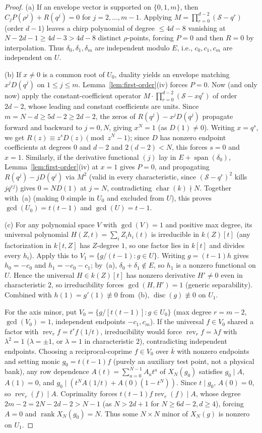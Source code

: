 \documentclass[11pt,reqno]{amsart}
\numberwithin{equation}{section}
\theoremstyle{definition}
\theoremstyle{remark}
\newcommand{\rank}{\operatorname{rank}}
\newcommand{\disc}{\operatorname{disc}}
\newcommand{\rev}{\operatorname{rev}}
\begin{document}
\begin{proof}
(a) If an envelope vector is supported on $\{0,1,m\}$, then $C_j P(\rho^j)+R(q^j)=0$ for $j=2,\ldots,m-1$. Applying $M=\prod_{r=0}^{d-2}(\mathcal{S}-q^r)$ (order $d-1$) leaves a chirp polynomial of degree $\le 4d-8$ vanishing at $N-2d-1\ge 4d-3 > 4d-8$ distinct $\rho$-points, forcing $P=0$ and then $R=0$ by interpolation. Thus $\delta_0,\delta_1,\delta_m$ are independent modulo $E$, i.e., $c_0,c_1,c_m$ are independent on $U$.

(b) If $x\ne 0$ is a common root of $U_0$, duality yields an envelope matching $x^j D(q^j)$ on $1\le j\le m$. Lemma~\ref{lem:first-order}(iv) forces $P=0$. Now (and only now) apply the constant-coefficient operator $M\cdot\prod_{r=0}^{d-2}(\mathcal{S}-xq^r)$ of order $2d-2$, whose leading and constant coefficients are units. Since $m=N-d\ge 5d-2\ge 2d-2$, the zeros of $R(q^j)-x^j D(q^j)$ propagate forward and backward to $j=0,N$, giving $x^N=1$ (as $D(1)\ne 0$). Writing $x=q^s$, we get $R(z)\equiv z^s D(z)\pmod{z^N-1}$; since $D$ has nonzero endpoint coefficients at degrees $0$ and $d-2$ and $2(d-2)<N$, this forces $s=0$ and $x=1$. Similarly, if the derivative functional $(j)$ lay in $E+\operatorname{span}(\delta_0)$, Lemma~\ref{lem:first-order}(iv) at $x=1$ gives $P=0$, and propagating $R(q^j)-jD(q^j)$ via $M^2$ (valid in every characteristic, since $(\mathcal{S}-q^r)^2$ kills $jq^{rj}$) gives $0=ND(1)$ at $j=N$, contradicting $\operatorname{char}(k)\nmid N$. Together with~(a) (making $0$ simple in $U_0$ and excluded from $U$), this proves $\gcd(U_0)=t(t-1)$ and $\gcd(U)=t-1$.

(c) For any polynomial space $V$ with $\gcd(V)=1$ and positive max degree, its universal polynomial $H(Z,t)=\sum_i Z_i h_i(t)$ is irreducible in $k(Z)[t]$ (any factorization in $k[t,Z]$ has $Z$-degree $1$, so one factor lies in $k[t]$ and divides every $h_i$). Apply this to $V_1 = \{g/(t-1) : g\in U\}$. Writing $g=(t-1)h$ gives $h_0=-c_0$ and $h_1=-c_0-c_1$; by~(a), $\delta_0+\delta_1\notin E$, so $h_1$ is a nonzero functional on $U$. Hence the universal $H\in k(Z)[t]$ has nonzero derivative $H'\ne 0$ even in characteristic $2$, so irreducibility forces $\gcd(H,H')=1$ (generic separability). Combined with $h(1)=g'(1)\not\equiv 0$ from~(b), $\disc(g)\not\equiv 0$ on $U_1$.

For the axis minor, put $V_0=\{g/[t(t-1)] : g\in U_0\}$ (max degree $r=m-2$, $\gcd(V_0)=1$, independent endpoints $-c_1,c_m$). If the universal $f\in V_0$ shared a factor with $\rev_r f = t^r f(1/t)$, irreducibility would force $\rev_r f = \lambda f$ with $\lambda^2=1$ ($\lambda=\pm 1$, or $\lambda=1$ in characteristic $2$), contradicting independent endpoints. Choosing a reciprocal-coprime $f\in V_0$ over $\overline{k}$ with nonzero endpoints and setting monic $g_0=t(t-1)f$ (purely an auxiliary test point, not a physical bank), any row dependence $A(t)=\sum_{a=0}^{N-1} A_a t^a$ of $X_N(g_0)$ satisfies $g_0\mid A$, $A(1)=0$, and $g_0\mid (t^N A(1/t)+A(0)(1-t^N))$. Since $t\mid g_0$, $A(0)=0$, so $\rev_r(f)\mid A$. Coprimality forces $t(t-1)f\rev_r(f)\mid A$, whose degree $2m-2 = 2N-2d-2 > N-1$ (as $N>2d+1$ for $N\ge 6d-2, d\ge 4$), forcing $A=0$ and $\rank X_N(g_0)=N$. Thus some $N\times N$ minor of $X_N(g)$ is nonzero on $U_1$.


\end{proof}
\end{document}
